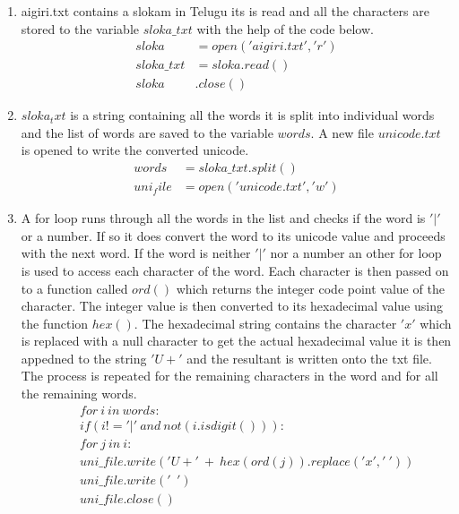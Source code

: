 \renewcommand{\theequation}{\theenumi}
\begin{enumerate}[label=\thesection.\arabic*.,ref=\thesection.\theenumi]

\item aigiri.txt contains a slokam in Telugu its is read and all the characters are stored to the variable $sloka\_txt$ with the help of the code below.
\begin{align*}
sloka &= open('aigiri.txt', 'r') \\
sloka\_txt &= sloka.read() \\
sloka &. close()
\end{align*}

\item $sloka_txt$ is a string containing all the words it is split into individual words and the list of words are saved to the variable $words$. A new file $unicode.txt$ is opened to write the converted unicode.
\begin{align*} 
words &= sloka\_txt.split() \\
uni_file &= open('unicode.txt', 'w')
\end{align*}

\item A  for loop runs through all the words in the list and checks if the word is $'|'$ or a number. If so it does convert the word to its unicode value and proceeds with the next word. If the word is neither $'|'$ nor a number an other for loop is used to access each character of the word. Each character is then passed on to a function called $ord()$ which returns the integer code point value of the character. The integer value is then converted to its hexadecimal value using the function $hex()$. The hexadecimal string contains the character $'x'$ which is replaced with a null character to get the actual hexadecimal value it is then appedned to the string $'U+'$ and the resultant is written onto the txt file. The process is repeated for the remaining characters in the word and for all the remaining words.
\begin{align*}
\ \ \ \ &for\ i\  in\  words:\\
&if(i !='|'\  and\  not(i.isdigit())):\\
&for\  j\  in\  i:\\
&uni\_file.write('U+'\  +\  hex(ord(j)).replace('x', '\ '))\\
&uni\_file.write('\ \ ')\\
&uni\_file.close()
\end{align*} 

\end{enumerate}
